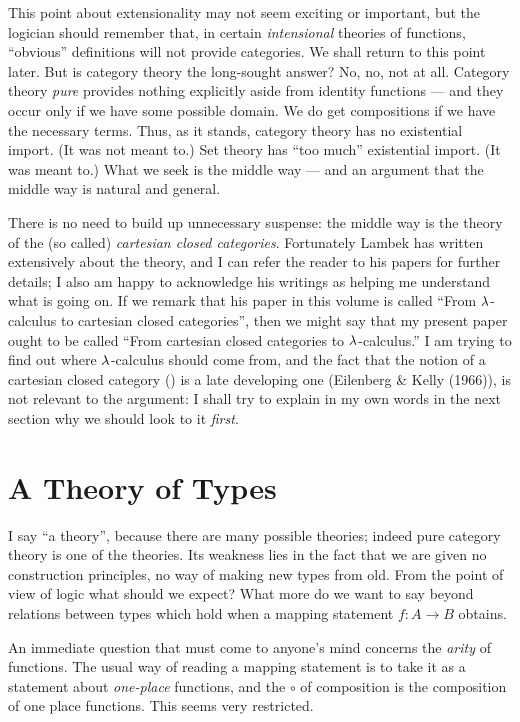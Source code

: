 This point about extensionality may not seem exciting or important, but the logician should remember that, in certain {\it intensional} theories of functions, ``obvious'' definitions will not provide categories. We shall return to this point later. But is category theory the long-sought answer? No, no, not at all. Category theory {\it pure} provides nothing explicitly aside from identity functions --- and they occur only if we have some possible domain. We do get compositions if we have the necessary terms. Thus, as it stands, category theory has no existential import. (It was not meant to.) Set theory has ``too much'' existential import. (It was meant to.) What we seek is the middle way --- and an argument that the middle way is natural and general.

There is no need to build up unnecessary suspense: the middle way is the theory of the (so called) {\it cartesian closed categories}.
Fortunately Lambek has written extensively about the theory, and I can refer the reader to his papers for further details; I also am happy to acknowledge his writings as helping me understand what is going on. If we remark that his paper in this volume is called ``From $\lambda$-calculus to cartesian closed categories'', then we might say that my present paper ought to be called ``From cartesian closed categories to $\lambda$-calculus.''
I am trying to find out where $\lambda$-calculus should come from, and the fact that the notion of a cartesian closed category (\ccc) is a late developing one (Eilenberg \& Kelly (1966)), is not relevant to the argument: I shall try to explain in my own words in the next section why we should look to it {\it first}.

\section{A Theory of Types}

I say ``a theory'', because there are many possible theories; indeed pure category theory is one of the theories.
Its weakness lies in the fact that we are given no construction principles, no way of making new types from old. From the point of view of logic what should we expect? What more do we want to say beyond relations between types which hold when a mapping statement $f : A\to B$ obtains.

An immediate question that must come to anyone's mind concerns the {\it arity} of functions. The usual way of reading a mapping statement is to take it as a statement about {\it one-place} functions, and the $\circ$ of composition is the composition of one place functions. This seems very restricted.

